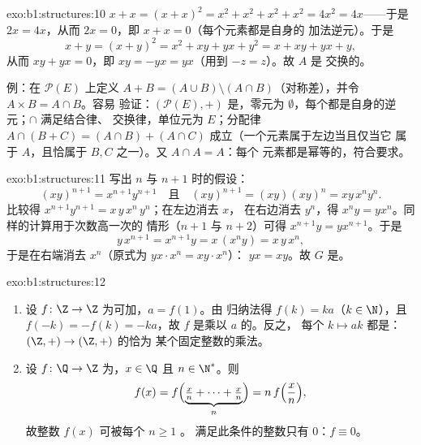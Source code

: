 \begin{solution}{exo:b1:structures:10}
$x + x = (x + x)^2 = x^2 + x^2 + x^2 + x^2 = 4x^2 = 4x$——于是 $2x =
4x$，从而 $2x = 0$，即 $x + x = 0$（每个元素都是自身的
加法逆元）。于是
\[
x + y = (x+y)^2 = x^2 + xy + yx + y^2 = x + xy + yx + y ,
\]
从而 $xy + yx = 0$，即 $xy = -yx = yx$（用到 $-z = z$）。故 $A$ 是
交换的。

例：在 $\mathcal{P}(E)$ 上定义 $A + B = (A \cup B) \setminus (A
\cap B)$（对称差），并令 $A \times B = A \cap B$。容易
验证：$(\mathcal{P}(E), +)$ 是，零元为
$\emptyset$，每个都是自身的逆元；$\cap$ 满足结合律、
交换律，单位元为 $E$；分配律 $A \cap (B + C) = (A
\cap B) + (A \cap C)$ 成立（一个元素属于左边当且仅当它
属于 $A$，且恰属于 $B, C$ 之一）。又 $A \cap A = A$：每个
元素都是幂等的，符合要求。
\end{solution}

\begin{solution}{exo:b1:structures:11}
写出 $n$ 与 $n+1$ 时的假设：
\[
(xy)^{n+1} = x^{n+1} y^{n+1}
\quad\text{且}\quad
(xy)^{n+1} = (xy)(xy)^n = xy\,x^n y^n .
\]
比较得 $x^{n+1} y^{n+1} = x\,y\,x^n\,y^n$；在左边消去 $x$，
在右边消去 $y^n$，得 $x^n y = y x^n$。同样的计算用于次数高一次的
情形（$n+1$ 与 $n+2$）可得 $x^{n+1} y = y x^{n+1}$。于是
\[
y\,x^{n+1} = x^{n+1} y = x\,(x^n y) = x\,y\,x^n ,
\]
于是在右端消去 $x^n$（原式为 $y x \cdot x^n = x y \cdot x^n$）：
$yx = xy$。故 $G$ 是。
\end{solution}

\begin{solution}{exo:b1:structures:12}
\begin{enumerate}
  \item 设 $f \colon \Z \to \Z$ 为可加，$a = f(1)$。由
        归纳法得 $f(k) = ka$（$k \in \N$），且 $f(-k) = -f(k) =
        -ka$，故 $f$ 是乘以 $a$ 的。反之，
        每个 $k \mapsto ak$ 都是：
        $(\Z,+) \to (\Z,+)$ 的恰为
        某个固定整数的乘法。
  \item 设 $f \colon \Q \to \Z$ 为，$x \in \Q$ 且
        $n \in \N^*$。则
        \[
        f(x) = f\Bigl(\underbrace{\tfrac xn + \dots +
        \tfrac xn}_{n}\Bigr) = n\,f\Bigl(\frac xn\Bigr) ,
        \]
        故整数 $f(x)$ 可被每个 $n \geq 1$ 。
        满足此条件的整数只有 $0$：$f \equiv 0$。
\end{enumerate}
\end{solution}

